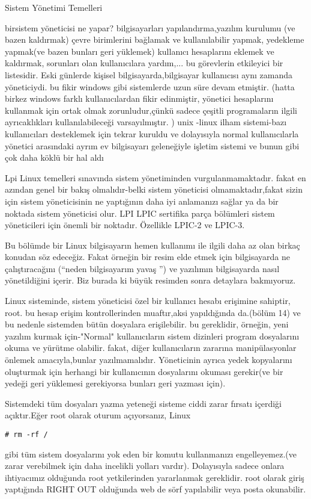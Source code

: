 \begin{section}{Sistem Yönetimi Temelleri}

birsistem yöneticisi ne yapar? bilgisayarları yapılandırma,yazılım kurulumu (ve bazen kaldırmak) çevre birimlerini bağlamak ve kullanılabilir yapmak, yedekleme yapmak(ve bazen bunları geri yüklemek) kullanıcı hesaplarını eklemek ve kaldırmak, sorunları olan kullanıcılara yardım,... bu görevlerin etkileyici bir listesidir. Eski günlerde kişisel bilgisayarda,bilgisayar kullanıcısı aynı zamanda yöneticiydi. bu fikir windows gibi sistemlerde uzun süre devam etmiştir. (hatta birkez windows farklı kullanıcılardan fikir edinmiştir,
yönetici hesaplarını kullanmak için ortak olmak zorunludur,çünkü sadece çeşitli programaların ilgili ayrıcaklıkları kullanılabileceği varsayılmıştır. )
unix -linux ilham sistemi-bazı kullanıcıları desteklemek için tekrar kuruldu ve dolayısıyla normal kullanıcılarla yönetici arasındaki ayrım ev bilgisayarı geleneğiyle işletim sistemi ve bunun gibi çok daha köklü bir hal aldı

Lpi Linux temelleri sınavında sistem yönetiminden vurgulanmamaktadır.
fakat en azından genel bir bakış olmalıdır-belki sistem yöneticisi olmamaktadır,fakat sizin için sistem yöneticisinin ne yaptığının daha iyi anlamanızı sağlar ya da bir noktada sistem yöneticisi olur. LPI   LPIC sertifika parça bölümleri sistem yöneticileri için önemli bir noktadır. Özellikle LPIC-2 ve LPIC-3. 

Bu bölümde bir Linux bilgisayarın  hemen kullanımı ile ilgili daha az olan birkaç konudan söz edeceğiz. Fakat  örneğin bir resim  elde etmek için bilgisayarda ne çalıştıracağını (“neden  bilgisayarım   yavaş ”)  ve yazılımın bilgisayarda nasıl yönetildiğini içerir. Biz burada ki büyük resimden sonra detaylara bakmıyoruz.  

Linux sisteminde, sistem yöneticisi özel bir kullanıcı hesabı erişimine sahiptir, root. bu hesap erişim kontrollerinden muaftır,aksi yapıldığında da.(bölüm 14)
ve bu nedenle sistemden  bütün dosyalara erişilebilir. bu gereklidir, örneğin, yeni yazılım kurmak için-"Normal" kullanıcıların sistem dizinleri program dosyalarını okuma ve yürütme olabilir. fakat, diğer kullanıcıların zararına manipülasyonlar önlemek amacıyla,bunlar yazılmamalıdır. Yöneticinin ayrıca yedek kopyalarını oluşturmak için herhangi bir kullanıcının dosyalarını okuması gerekir(ve  bir yedeği geri yüklemesi gerekiyorsa bunları geri 
yazması için).

Sistemdeki tüm  dosyaları yazma yeteneği sisteme ciddi zarar fırsatı  içerdiği açıktır.Eğer root olarak oturum açıyorsanız, Linux
\begin{verbatim}
# rm -rf /
\end{verbatim}
gibi  tüm sistem dosyalarını yok eden bir komutu kullanmanızı engelleyemez.(ve zarar verebilmek için daha incelikli yolları vardır). Dolayısıyla sadece onlara ihtiyacımız olduğunda root yetkilerinden yararlanmak gereklidir. root  olarak giriş yaptığında  RIGHT OUT olduğunda web de sörf  yapılabilir veya posta okunabilir.


\end{section}
